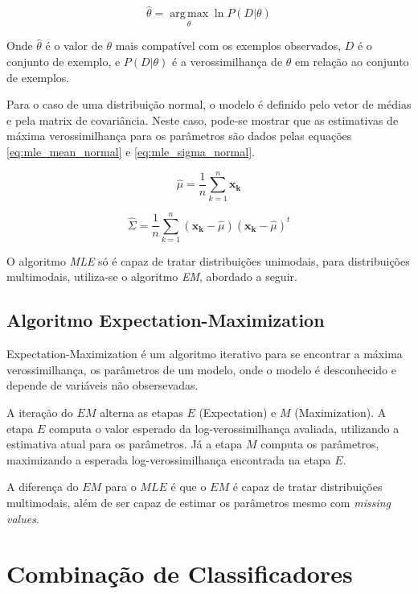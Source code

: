 \begin{equation}
\label{eq:mle}
\hat{\theta} = \operatorname*{arg\,max}_{\theta} \ln P(D | \theta)
\end{equation}

Onde $\hat{\theta}$ é o valor de $\theta$ mais compatível com os exemplos observados, $D$ é o conjunto de exemplo, e $P(D | \theta)$ é a verossimilhança de $\theta$ em relação ao conjunto de exemplos.

Para o caso de uma distribuição normal, o modelo é definido pelo vetor de médias e pela matrix de covariância. Neste caso, pode-se mostrar que as estimativas de máxima verossimilhança para os parâmetros são dados pelas equações \ref{eq:mle_mean_normal} e \ref{eq:mle_sigma_normal}.

\begin{equation}
\label{eq:mle_mean_normal}
\hat{\mu} = \frac{1}{n} \sum_{k = 1}^{n} \mathbf{x_k}
\end{equation}

\begin{equation}
\label{eq:mle_sigma_normal}
\hat{\Sigma } =  \dfrac{1}{n} \sum_{k = 1}^{n} (\mathbf{x_k} - \hat{\mu}) (\mathbf{x_k} - \hat{\mu})^t
\end{equation}

O algoritmo \textit{MLE} só é capaz de tratar distribuições unimodais, para distribuições multimodais, utiliza-se o algoritmo \textit{EM}, abordado a seguir.

\subsection{Algoritmo Expectation-Maximization}
\label{subsec:em}
Expectation-Maximization é um algoritmo iterativo para se encontrar a máxima verossimilhança, os parâmetros de um modelo, onde o modelo é desconhecido e depende de variáveis não obsersevadas. 

A iteração do $EM$ alterna as etapas $E$ (Expectation) e $M$ (Maximization). A etapa $E$ computa o valor esperado da log-verossimilhança avaliada, utilizando a estimativa atual para os parâmetros. Já a etapa $M$ computa os parâmetros, maximizando a esperada log-verossimilhança encontrada na etapa $E$.

A diferença do $EM$ para o $MLE$ é que o $EM$ é capaz de tratar distribuições multimodais, além de ser capaz de estimar os parâmetros mesmo com \textit{missing values}.

\section{Combinação de Classificadores}

